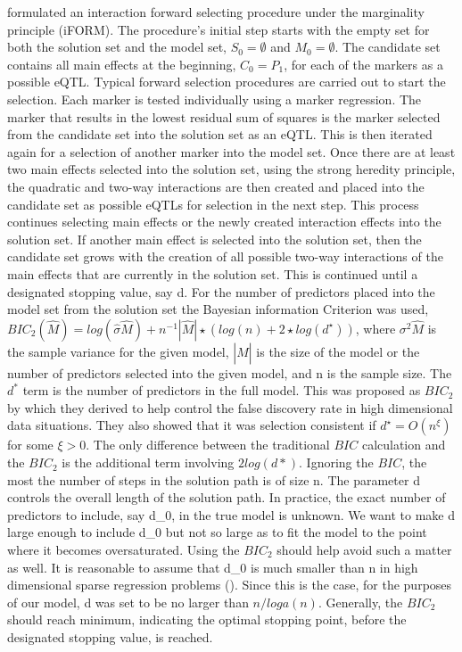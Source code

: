 \documentclass[11pt,]{book}
\theoremstyle{definition}
\theoremstyle{definition}
\theoremstyle{remark}
\begin{document}
\cite{hao2014interaction} formulated an interaction forward selecting
procedure under the marginality principle (iFORM). The procedure's
initial step starts with the empty set for both the solution set and the
model set, \(S_0=\emptyset\) and \(M_0=\emptyset\). The candidate set
contains all main effects at the beginning, \(C_0 = P_1\), for each of
the markers as a possible eQTL. Typical forward selection procedures are
carried out to start the selection. Each marker is tested individually
using a marker regression. The marker that results in the lowest
residual sum of squares is the marker selected from the candidate set
into the solution set as an eQTL. This is then iterated again for a
selection of another marker into the model set. Once there are at least
two main effects selected into the solution set, using the strong
heredity principle, the quadratic and two-way interactions are then
created and placed into the candidate set as possible eQTLs for
selection in the next step. This process continues selecting main
effects or the newly created interaction effects into the solution set.
If another main effect is selected into the solution set, then the
candidate set grows with the creation of all possible two-way
interactions of the main effects that are currently in the solution set.
This is continued until a designated stopping value, say d. For the
number of predictors placed into the model set from the solution set the
Bayesian information Criterion was used,
\(BIC_2(\hat M)=log(\hat \sigma \hat M)+n^{-1} |\hat M|\star(log(n)+2\star log(d^\star))\),
where \(\sigma^2 \hat M\) is the sample variance for the given model,
\(|\hat M|\) is the size of the model or the number of predictors
selected into the given model, and n is the sample size. The \(d^*\)
term is the number of predictors in the full model. This was proposed as
\(BIC_2\) by \cite{chen2008extended} which they derived to help control
the false discovery rate in high dimensional data situations. They also
showed that it was selection consistent if \(d^\star = O(n^\xi)\) for
some \(\xi > 0\). The only difference between the traditional \(BIC\)
calculation and the \(BIC_2\) is the additional term involving
\(2log(d*)\). Ignoring the \(BIC\), the most the number of steps in the
solution path is of size n. The parameter d controls the overall length
of the solution path. In practice, the exact number of predictors to
include, say d\_0, in the true model is unknown. We want to make d large
enough to include d\_0 but not so large as to fit the model to the point
where it becomes oversaturated. Using the \(BIC_2\) should help avoid
such a matter as well. It is reasonable to assume that d\_0 is much
smaller than n in high dimensional sparse regression problems
(\cite{fan2008sure}). Since this is the case, for the purposes of our
model, d was set to be no larger than \(n/loga(n)\). Generally, the
\(BIC_2\) should reach minimum, indicating the optimal stopping point,
before the designated stopping value, is reached.
\end{document}
